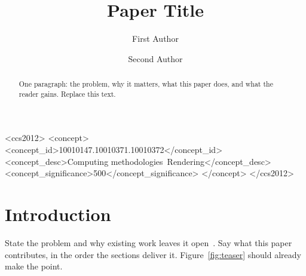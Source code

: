 \documentclass[sigconf]{acmart}
\begin{document}
\title{Paper Title}

\author{First Author}

\author{Second Author}

\begin{abstract}
One paragraph: the problem, why it matters, what this paper does, and what the reader
gains. Replace this text.
\end{abstract}

\begin{CCSXML}
<ccs2012>
   <concept>
       <concept_id>10010147.10010371.10010372</concept_id>
       <concept_desc>Computing methodologies~Rendering</concept_desc>
       <concept_significance>500</concept_significance>
   </concept>
</ccs2012>
\end{CCSXML}



\begin{teaserfigure}
  \caption{Teaser caption: what the reader sees at a glance.}
  \label{fig:teaser}
\end{teaserfigure}

\maketitle

\section{Introduction}
\label{sec:intro}

State the problem and why existing work leaves it open~\cite{example2020method}. Say
what this paper contributes, in the order the sections deliver it. Figure~\ref{fig:teaser}
should already make the point.
\end{document}
